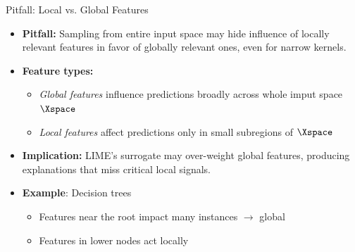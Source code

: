 \documentclass[11pt,compress,t,notes=noshow, aspectratio=169, xcolor=table]{beamer}
\begin{document}
\begin{frame}{Pitfall: Local vs. Global Features }

\begin{itemize}%
	\item<1-> \textbf{Pitfall:} Sampling from entire input space may hide influence of locally relevant features in favor of globally relevant ones, even for narrow kernels.
 \item<1-> \textbf{Feature types:}
  \begin{itemize}
    \item \emph{Global features} influence predictions broadly across whole imput space $\Xspace$
    \item \emph{Local features} affect predictions only in small subregions of $\Xspace$
  \end{itemize}
  
  \item<2-> \textbf{Implication:} LIME’s surrogate may over-weight global features, producing explanations that miss critical local signals.
	\item<3-> \textbf{Example}: Decision trees
    \begin{itemize}
        \item Features near the root impact many instances $\rightarrow$ global
        \item Features in lower nodes act locally
    \end{itemize}
\end{itemize}

\end{frame}
\end{document}
